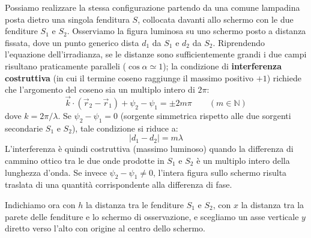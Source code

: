 \documentclass[openany,a4paper,12pt]{book}
\begin{document}
\begin{figure}[H]
\end{figure}

Possiamo realizzare la stessa configurazione partendo da una comune lampadina posta dietro una singola fenditura $S$, collocata davanti allo schermo con le due fenditure $S_1$ e $S_2$.
Osserviamo la figura luminosa su uno schermo posto a distanza fissata, dove un punto generico dista $d_1$ da $S_1$ e $d_2$ da $S_2$. Riprendendo l'equazione dell'irradianza, se le distanze sono sufficientemente grandi i due campi risultano praticamente paralleli ($\cos\alpha \simeq 1$); la condizione di \textbf{interferenza costruttiva} (in cui il termine coseno raggiunge il massimo positivo $+1$) richiede che l'argomento del coseno sia un multiplo intero di $2\pi$:
\[
    \vec{k} \cdot (\vec{r}_2 - \vec{r}_1) + \psi_2 - \psi_1 = \pm 2m\pi \qquad (m \in \mathbb{N})
\]
dove $k = 2\pi/\lambda$.
Se $\psi_2 - \psi_1 = 0$ (sorgente simmetrica rispetto alle due sorgenti secondarie $S_1$ e $S_2$), tale condizione si riduce a:
\[
    |d_1 - d_2| = m\lambda
\]
L'interferenza è quindi costruttiva (massimo luminoso) quando la differenza di cammino ottico tra le due onde prodotte in $S_1$ e $S_2$ è un multiplo intero della lunghezza d'onda. Se invece $\psi_2 - \psi_1 \neq 0$, l'intera figura sullo schermo risulta traslata di una quantità corrispondente alla differenza di fase.

Indichiamo ora con $h$ la distanza tra le fenditure $S_1$ e $S_2$, con $x$ la distanza tra la parete delle fenditure e lo schermo di osservazione, e scegliamo un asse verticale $y$ diretto verso l'alto con origine al centro dello schermo.
\end{document}
